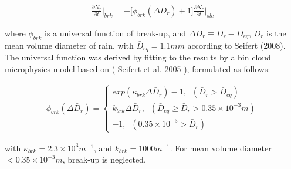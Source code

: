 \begin{eqnarray}
\frac{\partial N_{r}}{\partial t}\Bigr|_{brk}=-\bigl[\phi_{brk}(\Delta \bar{D}_{r})+1\bigr]\frac{\partial N_{r}}{\partial t}\Bigr|_{slc}\label{sn154}
\end{eqnarray}

where $\phi_{brk}$ is a universal function of break-up, and $\Delta \bar{D}_{r}\equiv \bar{D}_{r}-\bar{D}_{eq}$, $\bar{D}_{r}$ is the mean volume diameter of rain, with $\bar{D}_{eq} = 1.1 mm$ according to Seifert (2008). The universal function was derived by fitting to the results by a bin cloud microphysics model based on ( Seifert et al. 2005 ), formulated as follows:

\begin{eqnarray}
\phi_{brk}(\Delta\bar{D}_{r})=
\left\{
\begin{array}{l}
exp(\kappa_{brk}\Delta\bar{D}_{r})-1,\;\;(\bar{D}_{r}>\bar{D}_{eq}) \\
k_{brk}\Delta\bar{D}_{r},\;\;(\bar{D}_{eq}\geq \bar{D}_{r}>0.35\times 10^{-3}m) \\
-1,\;\;(0.35\times10^{-3}>\bar{D}_{r})
\label{sn155}
\end{array}
\right.
\end{eqnarray}

with $\kappa_{brk} = 2.3 \times 10^{3} m^{-1}$, and $k_{brk} = 1000 m^{-1}$. For mean volume diameter $< 0.35 \times 10^{-3}m$, break-up is neglected.

